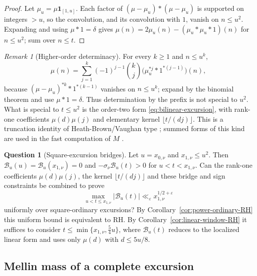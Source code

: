 \documentclass[11pt]{amsart}
\numberwithin{equation}{section}
\theoremstyle{plain}
\theoremstyle{definition}
\newtheorem{question}[theorem]{Question}
\theoremstyle{remark}
\newtheorem{remark}[theorem]{Remark}
\newcommand{\eps}{\varepsilon}
\begin{document}
\begin{proof}
Let $\mu_u=\mu\mathbf1_{[1,u]}$. Each factor of $(\mu-\mu_u)*(\mu-\mu_u)$ is
supported on integers $>u$, so the convolution, and its convolution with
$1$, vanish on $n\le u^2$. Expanding and using $\mu*1=\delta$ gives
$\mu(n)=2\mu_u(n)-(\mu_u*\mu_u*1)(n)$ for $n\le u^2$; sum over $n\le t$.
\end{proof}

\begin{remark}[Higher-order determinacy]
\label{rem:prefix-k}
For every $k\ge1$ and $n\le u^k$,
\begin{equation}
\label{eq:HB-k}
\mu(n)=\sum_{j=1}^{k}(-1)^{j-1}\binom{k}{j}
\bigl(\mu_u^{*j}*1^{*(j-1)}\bigr)(n),
\end{equation}
because $(\mu-\mu_u)^{*k}*1^{*(k-1)}$ vanishes on $n\le u^k$; expand by the
binomial theorem and use $\mu*1=\delta$. Thus determination by the prefix
is not special to $u^2$. What is special to $t\le u^2$ is the order-two form
\eqref{eq:bilinear-excursion}, with rank-one coefficients $\mu(d)\mu(j)$ and
elementary kernel $\lfloor t/(dj)\rfloor$. This is a truncation identity of
Heath-Brown/Vaughan type \cite{HB82}; summed forms of this kind are used in
the fast computation of $M$ \cite{HT23}.
\end{remark}

\begin{question}[Square-excursion bridges]
\label{q:excursion-constraint}
Let $u=x_{0,\nu}$ and $x_{1,\nu}\le u^2$. Then
$\mathcal B_u(u)=\mathcal B_u(x_{1,\nu})=0$ and
$-\sigma_\nu\mathcal B_u(t)>0$ for $u<t<x_{1,\nu}$. Can the rank-one
coefficients $\mu(d)\mu(j)$, the kernel $\lfloor t/(dj)\rfloor$ and these
bridge and sign constraints be combined to prove
\[
\max_{u<t\le x_{1,\nu}}|\mathcal B_u(t)|
\ll_\eps x_{1,\nu}^{1/2+\eps}
\]
uniformly over square-ordinary excursions? By
Corollary~\ref{cor:power-ordinary-RH} this uniform bound is equivalent to
RH. By Corollary~\ref{cor:linear-window-RH} it suffices to consider
$t\le\min\{x_{1,\nu},\frac54u\}$, where $\mathcal B_u(t)$ reduces to
the localized linear form and uses only $\mu(d)$ with $d\le5u/8$.
\end{question}

\subsection{Mellin mass of a complete excursion}
\end{document}
